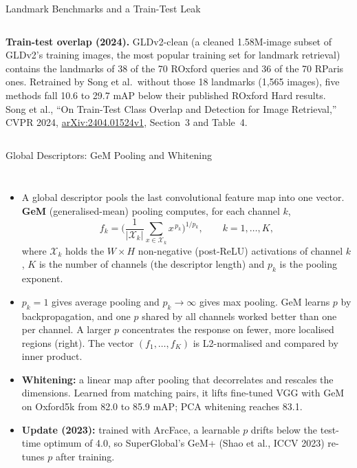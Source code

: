 \begin{frame}{Landmark Benchmarks and a Train-Test Leak}
\begin{columns}[T,onlytextwidth]
\begin{tcolorbox}[colframe=KAred, colback=gray!6, boxrule=0.5pt, left=4pt, right=4pt, top=3pt, bottom=3pt]
        \scriptsize\textbf{Train-test overlap (2024).} GLDv2-clean (a cleaned 1.58M-image subset of GLDv2's training images, the most popular training set for landmark retrieval) contains the landmarks of 38 of the 70 ROxford queries and 36 of the 70 RParis ones. Retrained by Song et al.\ without those 18 landmarks (1{,}565 images), five methods fall 10.6 to 29.7 mAP below their published ROxford Hard results.\\[0.2em]
        Song et al., ``On Train-Test Class Overlap and Detection for Image Retrieval,'' CVPR 2024, \href{https://arxiv.org/abs/2404.01524v1}{arXiv:2404.01524v1}, Section~3 and Table~4.
      \end{tcolorbox}
  \end{columns}
\end{frame}

\begin{frame}{Global Descriptors: GeM Pooling and Whitening}
  \begin{columns}[T,onlytextwidth]
      \begin{itemize}\scriptsize\itemsep0.3em
        \item A global descriptor pools the last convolutional feature map into one vector. \textbf{GeM} (generalised-mean) pooling computes, for each channel $k$,
        \[ f_k = \Big( \frac{1}{|\mathcal{X}_k|} \sum_{x \in \mathcal{X}_k} x^{\,p_k} \Big)^{1/p_k}, \qquad k = 1, \dots, K, \]
        where $\mathcal{X}_k$ holds the $W \times H$ non-negative (post-ReLU) activations of channel $k$, $K$ is the number of channels (the descriptor length) and $p_k$ is the pooling exponent.
        \item $p_k = 1$ gives average pooling and $p_k \to \infty$ gives max pooling. GeM learns $p$ by backpropagation, and one $p$ shared by all channels worked better than one per channel. A larger $p$ concentrates the response on fewer, more localised regions (right). The vector $(f_1, \dots, f_K)$ is L2-normalised and compared by inner product.
        \item \textbf{Whitening:} a linear map after pooling that decorrelates and rescales the dimensions. Learned from matching pairs, it lifts fine-tuned VGG with GeM on Oxford5k from 82.0 to 85.9 mAP; PCA whitening reaches 83.1.
        \item \textbf{Update (2023):} trained with ArcFace, a learnable $p$ drifts below the test-time optimum of 4.0, so SuperGlobal's GeM+ (Shao et al., ICCV 2023) re-tunes $p$ after training.
      \end{itemize}

\end{columns}
\end{frame}
